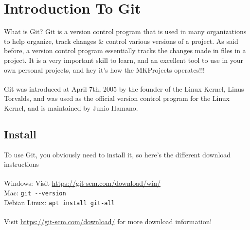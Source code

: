 \chapter{Introduction To Git}
What is Git? Git is a version control program that is used in many organizations to help organize, track changes \& control various versions of a project. 
As said before, a version control program essentially tracks the changes made in files in a project. It is a very important skill to learn, and an excellent 
tool to use in your own personal projects, and hey it's how the MKProjects operates!!!
\\\\
Git was introduced at April 7th, 2005 by the founder of the Linux Kernel, Linus Torvalds, and was used as the official version control program for the Linux Kernel, 
and is maintained by Junio Hamano. 

\section{Install}

To use Git, you obviously need to install it, so here's the different download instructions 
\\\\
Windows: Visit \url{https://git-scm.com/download/win/}\\
Mac: \verb!git --version!\\
Debian Linux: \verb!apt install git-all!
\\\\
Visit \url{https://git-scm.com/download/} for more download information!
\newpage